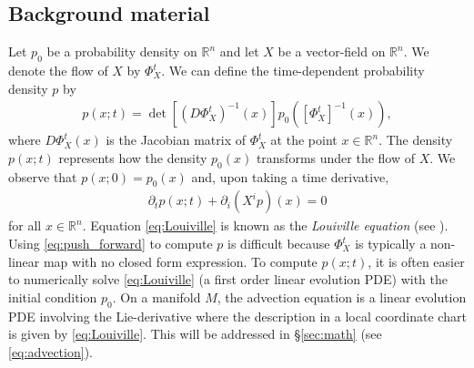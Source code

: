 \documentclass[letterpaper, 12 pt]{amsart}
\newcommand{\R}{\mathbb{R}}
\begin{document}
\subsection{Background material}
  Let $p_0$ be a probability density on $\R^n$
  and let $X$ be a vector-field on $\R^n$.
  We denote the flow of $X$
  by $\Phi_X^t$.
  We can define the time-dependent probability
  density $p$ by
  \begin{align}
    p( x ; t) = 
     \det\left[ (D\Phi_X^t)^{-1}(x) \right] p_0\left( \left[\Phi_X^t\right]^{-1}(x) \right), \label{eq:push_forward}
  \end{align}
  where $D\Phi_X^t(x)$ is the Jacobian matrix of
  $\Phi_X^t$ at the point $x \in \R^n$.
  The density $p(x;t)$ represents how the density
  $p_0(x)$ transforms under the flow of $X$.
  We observe that $p(x;0) = p_0(x)$ and, upon taking
  a time derivative,
  \begin{align}
    \partial_t p (x;t) + \partial_i (X^i p)(x) = 0 \label{eq:Louiville}
  \end{align}
  for all $x \in \R^n$.
  Equation \eqref{eq:Louiville} is known as the \emph{Louiville equation} (see \cite{LasotaMackey1994}).
  Using \eqref{eq:push_forward} to compute $p$ is difficult
  because $\Phi_X^t$ is typically a non-linear map with no closed
  form expression.
  To compute $p( x ; t)$, it is often easier
  to numerically solve \eqref{eq:Louiville}
  (a first order linear evolution PDE)
  with the initial condition $p_0$.
  On a manifold $M$, the advection equation is a linear
  evolution PDE involving the Lie-derivative
  where the description in a local coordinate chart is
  given by \eqref{eq:Louiville}.
  This will be addressed in \S \ref{sec:math} (see \eqref{eq:advection}).
\end{document}
